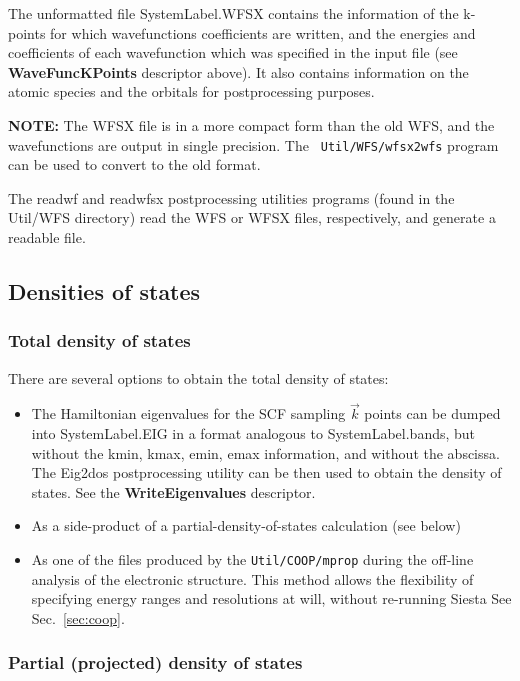 \documentclass[11pt]{article}
\begin{document}
The unformatted file SystemLabel.WFSX contains the information of the
k-points for which wavefunctions coefficients are written, and the
energies and coefficients of each wavefunction which was specified in
the input file (see {\bf WaveFuncKPoints} descriptor above). It also contains information
on the atomic species and the orbitals for postprocessing purposes.

{\bf NOTE:} The WFSX file is in a more compact form than the old WFS,
and the wavefunctions are output in single precision. The {\tt
  Util/WFS/wfsx2wfs} program can be used to convert to the old format.

\noindent
The readwf and readwfsx postprocessing
utilities programs (found in the Util/WFS directory) read the WFS or WFSX
files, respectively, and generate a readable file.


\vspace{5pt}
\subsection{Densities of states}

\subsubsection{Total density of states}
There are several options to obtain the
total density of states:
\begin{itemize}
\item The Hamiltonian eigenvalues for the SCF sampling $\vec k$ points can be
dumped into SystemLabel.EIG in a format analogous to SystemLabel.bands,
but without the kmin, kmax, emin, emax information, and without
the abscissa. The {\sc Eig2dos}
postprocessing utility can be then used to obtain the density of
states.
See the {\bf WriteEigenvalues} descriptor.
%
\item As a side-product of a partial-density-of-states calculation
  (see below)
\item As one of the files produced by the {\tt Util/COOP/mprop} during
  the off-line analysis of the electronic structure. This method
  allows the flexibility of specifying energy ranges and resolutions
  at will, without re-running {\sc Siesta} See Sec.~\ref{sec:coop}.
\end{itemize}

\subsubsection{Partial (projected) density of states}
\end{document}
